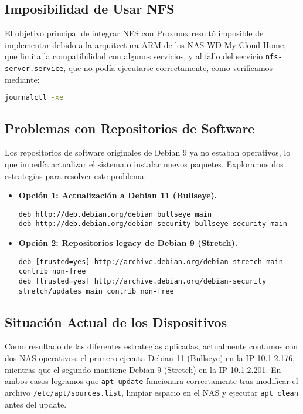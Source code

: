 \documentclass[12pt, a4paper]{article}
\begin{document}
\subsection{Imposibilidad de Usar NFS}
El objetivo principal de integrar NFS con Proxmox resultó imposible de implementar debido a la arquitectura ARM de los NAS WD My Cloud Home, que limita la compatibilidad con algunos servicios, y al fallo del servicio \texttt{nfs-server.service}, que no podía ejecutarse correctamente, como verificamos mediante: \\

\begin{lstlisting}[language=bash, caption=Verificación del servicio NFS.]
journalctl -xe
\end{lstlisting}

\subsection{Problemas con Repositorios de Software}
Los repositorios de software originales de Debian 9 ya no estaban operativos, lo que impedía actualizar el sistema o instalar nuevos paquetes. Exploramos dos estrategias para resolver este problema:

\begin{itemize}
    \item \textbf{Opción 1: Actualización a Debian 11 (Bullseye).}
    \begin{lstlisting}
deb http://deb.debian.org/debian bullseye main
deb http://deb.debian.org/debian-security bullseye-security main
    \end{lstlisting}
    
    \item \textbf{Opción 2: Repositorios legacy de Debian 9 (Stretch).}
    \begin{lstlisting}
deb [trusted=yes] http://archive.debian.org/debian stretch main contrib non-free
deb [trusted=yes] http://archive.debian.org/debian-security stretch/updates main contrib non-free
    \end{lstlisting}
\end{itemize}

\subsection{Situación Actual de los Dispositivos}
Como resultado de las diferentes estrategias aplicadas, actualmente contamos con dos NAS operativos: el primero ejecuta Debian 11 (Bullseye) en la IP 10.1.2.176, mientras que el segundo mantiene Debian 9 (Stretch) en la IP 10.1.2.201. En ambos casos logramos que \texttt{apt update} funcionara correctamente tras modificar el archivo \texttt{/etc/apt/sources.list}, limpiar espacio en el NAS y ejecutar \texttt{apt clean} antes del update.
\end{document}
